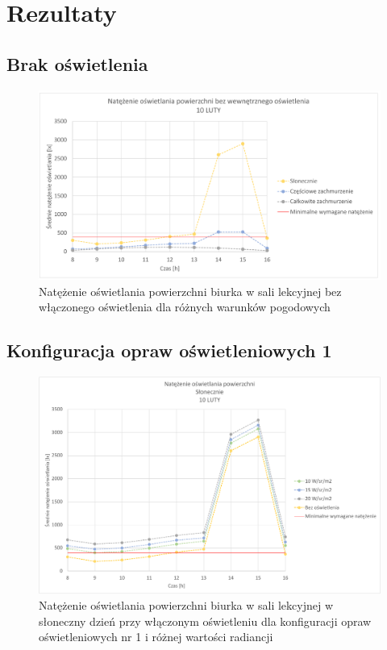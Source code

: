 \documentclass[a4paper,12pt]{article}
\begin{document}
	\section{Rezultaty}
	\label{sec:rezultaty}
	
	\subsection{Brak oświetlenia}
	\label{sec:brak_oswietlenia}
	
	\begin{figure}[ht!]
		\centering
		\includegraphics[scale=0.8]{Wykresy/bez_oswietlenia_1.pdf}
		\caption{Natężenie oświetlania powierzchni biurka w sali lekcyjnej bez włączonego oświetlenia dla różnych warunków pogodowych }
		\label{bez_oswietlenia_1}
	\end{figure}

	\subsection{Konfiguracja opraw oświetleniowych 1}
	\label{sec:oswietlenie_1}

	\begin{figure}[ht!]
		\centering
		\includegraphics[scale=0.8]{Wykresy/oswietlenie_1_slonecznie.pdf}
		\caption{Natężenie oświetlania powierzchni biurka w sali lekcyjnej w słoneczny dzień przy włączonym oświetleniu dla konfiguracji opraw oświetleniowych nr 1 i różnej wartości radiancji}
		\label{oswietlenie_1_slonecznie}
	\end{figure}
\end{document}
